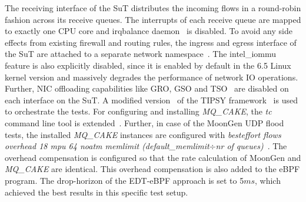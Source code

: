 The receiving interface of the SuT distributes the incoming flows in a round-robin fashion across its receive queues.
%
The interrupts of each receive queue are mapped to exactly one CPU core and irqbalance daemon~\cite{irqbalance} is disabled.
%
To avoid any side effects from existing firewall and routing rules, the ingress and egress interface of the SuT are attached to a separate network namespace~\cite{network-namespace}.
%
The intel\_iommu~\cite{iommu} feature is also explicitly disabled, since it is enabled by default in the 6.5 Linux kernel version and massively degrades the performance of network IO operations.
%
Further, NIC offloading capabilities like GRO, GSO and TSO~\cite{offloads} are disabled on each interface on the SuT.
%
A modified version~\cite{my-modified-tipsy} of the TIPSY framework~\cite{tipsy} is used to orchestrate the tests.
%
For configuring and installing \textit{MQ\_CAKE}, the \textit{tc} command line tool is extended~\cite{my-iproute}.
%
Further, in case of the MoonGen UDP flood tests, the installed \textit{MQ\_CAKE} instances are configured with \textit{besteffort flows overhead 18 mpu 64 noatm memlimit (default\_memlimit$\div$nr of queues)}~\cite{cake-manual}.
%
The overhead compensation is configured so that the rate calculation of MoonGen and \textit{MQ\_CAKE} are identical.
%
This overhead compensation is also added to the eBPF program.
%
The drop-horizon of the EDT-eBPF approach is set to 5$ms$, which achieved the best results in this specific test setup.


